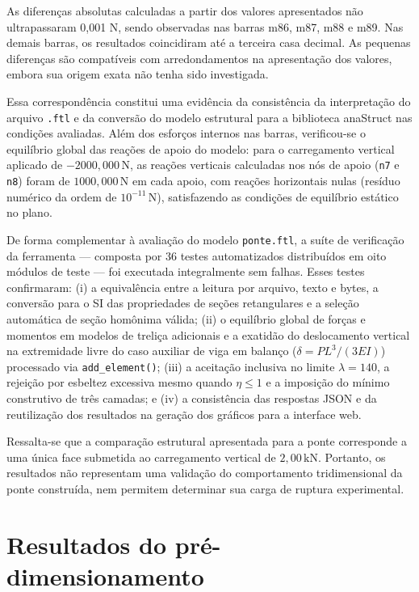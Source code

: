 As diferenças absolutas calculadas a partir dos valores apresentados não ultrapassaram 0,001 N, sendo observadas nas barras m86, m87, m88 e m89. Nas demais barras, os resultados coincidiram até a terceira casa decimal. As pequenas diferenças são compatíveis com arredondamentos na apresentação dos valores, embora sua origem exata não tenha sido investigada.

Essa correspondência constitui uma evidência da consistência da interpretação do arquivo \texttt{.ftl} e da conversão do modelo estrutural para a biblioteca anaStruct nas condições avaliadas. Além dos esforços internos nas barras, verificou-se o equilíbrio global das reações de apoio do modelo: para o carregamento vertical aplicado de \(-2000,000\,\mathrm{N}\), as reações verticais calculadas nos nós de apoio (\texttt{n7} e \texttt{n8}) foram de \(1000,000\,\mathrm{N}\) em cada apoio, com reações horizontais nulas (resíduo numérico da ordem de \(10^{-11}\,\mathrm{N}\)), satisfazendo as condições de equilíbrio estático no plano.

De forma complementar à avaliação do modelo \texttt{ponte.ftl}, a suíte de verificação da ferramenta — composta por 36 testes automatizados distribuídos em oito módulos de teste — foi executada integralmente sem falhas. Esses testes confirmaram: (i) a equivalência entre a leitura por arquivo, texto e bytes, a conversão para o \gls{SI} das propriedades de seções retangulares e a seleção automática de seção homônima válida; (ii) o equilíbrio global de forças e momentos em modelos de treliça adicionais e a exatidão do deslocamento vertical na extremidade livre do caso auxiliar de viga em balanço (\(\delta = PL^3/(3EI)\)) processado via \texttt{add\_element()}; (iii) a aceitação inclusiva no limite \(\lambda = 140\), a rejeição por esbeltez excessiva mesmo quando \(\eta \leq 1\) e a imposição do mínimo construtivo de três camadas; e (iv) a consistência das respostas \gls{JSON} e da reutilização dos resultados na geração dos gráficos para a interface web.

Ressalta-se que a comparação estrutural apresentada para a ponte corresponde a uma única face submetida ao carregamento vertical de \(2,00\,\mathrm{kN}\). Portanto, os resultados não representam uma validação do comportamento tridimensional da ponte construída, nem permitem determinar sua carga de ruptura experimental.

\section{Resultados do pré-dimensionamento}
\label{sec:resultados-pre-dimensionamento}

